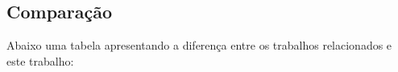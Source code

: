 \documentclass[
    12pt,                %
    openright,           %
    oneside,             %
    a4paper,             %
    english,             %
    brazil               %
]{abntex2}
\begin{document}
\subsection{Comparação}


Abaixo uma tabela apresentando a diferença entre os trabalhos relacionados e este trabalho:
\end{document}
